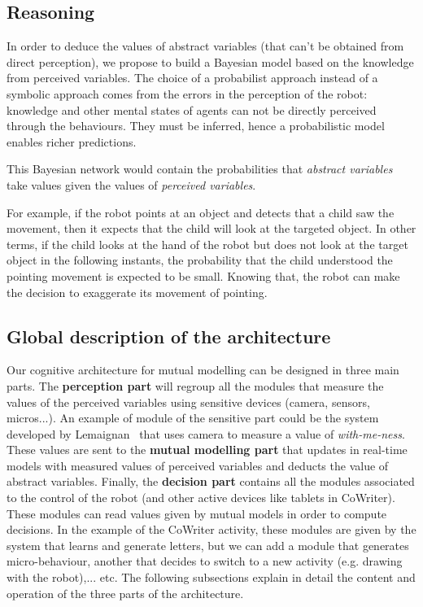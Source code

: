 \documentclass[conference]{IEEEtran}
\begin{document}
\subsection{Reasoning}

In order to deduce the values of abstract variables (that can't be obtained from direct perception),
we propose to build a Bayesian model based on the knowledge from perceived variables. 
The choice of a probabilist approach instead of a symbolic approach comes from the errors in the perception of the robot: knowledge and other mental states of agents can not be directly perceived through the behaviours. They must be inferred, hence a probabilistic model enables
richer predictions.

This Bayesian network would contain the probabilities that \emph{abstract variables} take values given the values of \emph{perceived variables}. 

For example, if the robot points at an object and detects that a child saw the movement,
then it expects that the child will look at the targeted object. 
In other terms, if the child looks at the hand of the robot but does not look at the target object in the following instants,  
the probability that the child understood the pointing movement is expected to be small.
Knowing that, the robot can make the decision to exaggerate its movement of pointing. 


\subsection{Global description of the architecture}

Our cognitive architecture for mutual modelling can be designed in three main parts. 
The \textbf{perception part} will regroup all the modules that measure the values of the perceived variables using sensitive devices (camera, sensors, micros...). 
An example of module of the sensitive part could be the system developed by Lemaignan~\cite{lemaignan2016realtime} that uses camera to measure a value of \textit{with-me-ness}. 
These values are sent to the \textbf{mutual modelling part} that updates in real-time models with measured values of perceived variables and deducts the value of abstract variables. Finally, the \textbf{decision part} contains all the modules associated to the control of the robot (and other active devices like tablets in CoWriter). These modules can read values given by mutual models in order to compute decisions. In the example of the CoWriter activity, these modules are given by the system that learns and generate letters, but we can add a module that generates micro-behaviour, another that decides to switch to a new activity (e.g. drawing with the robot),... etc. The following subsections explain in detail the content and operation of the three parts of the architecture. 
\end{document}
